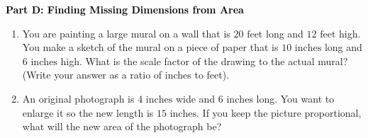 \documentclass[12pt, letterpaper, fleqn]{article}
\begin{document}
\newpage

\begin{tcolorbox}[colback=customteal!20]
\large\textcolor{black}{\textbf{Part D: Finding Missing Dimensions from Area}}
\end{tcolorbox}

\vspace{3mm}

\begin{enumerate}[itemsep=5.5cm, leftmargin=0.6cm, resume]
\item You are painting a large mural on a wall that is $20\text{ feet}$ long and $12\text{ feet}$ high. You make a sketch of the mural on a piece of paper that is $10\text{ inches}$ long and $6\text{ inches}$ high. What is the scale factor of the drawing to the actual mural? (Write your answer as a ratio of inches to feet).
\item An original photograph is $4\text{ inches}$ wide and $6\text{ inches}$ long. You want to enlarge it so the new length is $15\text{ inches}$. If you keep the picture proportional, what will the new area of the photograph be?
\end{enumerate}
\end{document}
